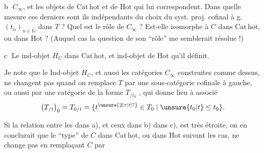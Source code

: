 
\textcircled{b} $C_\infty$, et les objets de $\mathrm{Cat\,hot}$ et de $\mathrm{Hot}$ qui lui correspondent. Dans quelle mesure ces derniers sont ils indépendants du choix du syst. proj. cofinal à g. $(t_n)_{n\in\mathbb N}$ dans $T$ ? Quel est le rôle de $C_\infty$ ? Est-elle  isomorphe à $C$ dans $\mathrm{Cat\,hot}$, ou dans $\mathrm{Hot}$ ? (Auquel cas la question de son ``rôle'' me semblerait résolue !)

\textcircled{c} Le ind-objet $H_C$ dans $\mathrm{Cat\,hot}$, et  ind-objet de $\mathrm{Hot}$ qu'il définit.

Je note que le Ind-objet $H_C$, et aussi les catégories $C_\infty$ construites comme dessus, ne changent pas quand on remplace $T$ par une sous-catégorie  cofinale à gauche, ou  aussi par une catégorie de la forme $T_{/t_0}$ , qui donne lieu à    associé
\[
\bigl(T_{/t}\bigr)_0=T_{0/t}=\{t^{\unsure{2|\tau|\prime|?}}\in T_0\mid \unsure{t_0|t}\leq t_0\}.
\]

Si la relation entre les   dans a), et ceux dans b)  dans c), est très étroite, on en conclurait que le ``type''  de $C$ dans $\mathrm{Cat\,hot}$, ou dans $\mathrm{Hot}$ suivant les cas, ne change pas en remplaçant $C$ par

